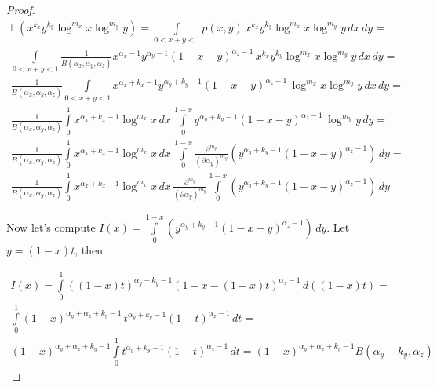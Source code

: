 \documentclass{article}
\begin{document}
\begin{theorem}
\begin{proof}
	\begin{multline*}
	\mathbb{E}(x^{k_x} y^{k_y} \log^{m_x} x \log^{m_y} y) = \int\limits_{0 < x + y < 1} {p(x, y) \, x^{k_x} y^{k_y} \log^{m_x} x \log^{m_y} y \, dx \, dy} = 
	\\ \int\limits_{0 < x + y < 1} {\frac{1}{B(\alpha_x, \alpha_y, \alpha_z)} x^{\alpha_x - 1} y^{\alpha_y - 1} (1 - x - y)^{\alpha_z - 1} \, x^{k_x} y^{k_y} \log^{m_x} x \log^{m_y} y \, dx \, dy} = 
	\\ \frac{1}{B(\alpha_x, \alpha_y, \alpha_z)} \int\limits_{0 < x + y < 1} { x^{\alpha_x + k_x - 1} y^{\alpha_y + k_y - 1} (1 - x - y)^{\alpha_z - 1} \, \log^{m_x} x \log^{m_y} y \, dx \, dy} = 
	\\ \frac{1}{B(\alpha_x, \alpha_y, \alpha_z)} \int\limits_0^1 { x^{\alpha_x + k_x - 1} \log^{m_x}{x} \, dx \, \int\limits_0^{1-x}{ y^{\alpha_y + k_y - 1} (1 - x - y)^{\alpha_z - 1} \, \log^{m_y} y \, dy}} = 
	\\  \frac{1}{B(\alpha_x, \alpha_y, \alpha_z)} \int\limits_0^1 { x^{\alpha_x + k_x - 1} \log^{m_x}{x} \, dx \, \int\limits_0^{1-x}{ \frac{\partial^{m_y}}{(\partial \alpha_y)^{m_y}} (y^{\alpha_y + k_y - 1} (1 - x - y)^{\alpha_z - 1}) \, dy}} = 
	\\ \frac{1}{B(\alpha_x, \alpha_y, \alpha_z)} \int\limits_0^1 { x^{\alpha_x + k_x - 1} \log^{m_x}{x} \, dx \, \frac{\partial^{m_y}}{(\partial \alpha_y)^{m_y}} \int\limits_0^{1-x}{  (y^{\alpha_y + k_y - 1} (1 - x - y)^{\alpha_z - 1}) \, dy}} 
	\end{multline*}
	
	Now let's compute $I(x) = \int\limits_0^{1-x}{  (y^{\alpha_y + k_y - 1} (1 - x - y)^{\alpha_z - 1}) \, dy} $. Let $y = (1 - x)t$, then
	
	\begin{multline*}
	I(x) = \int\limits_0^1{((1 - x)t)^{\alpha_y + k_y - 1} (1 - x - (1 - x)t)^{\alpha_z - 1} \, d((1 - x)t)} = \\ \int\limits_0^1{(1 - x)^{\alpha_y + \alpha_z + k_y - 1} \, t^{\alpha_y + k_y - 1} (1 - t)^{\alpha_z - 1} \, dt} = \\ (1 - x)^{\alpha_y + \alpha_z + k_y - 1} \int\limits_0^1{t^{\alpha_y + k_y - 1} (1 - t)^{\alpha_z - 1} \, dt} = (1 - x)^{\alpha_y + \alpha_z + k_y - 1} B(\alpha_y + k_y, \alpha_z)
	\end{multline*}
	

\end{proof}
\end{theorem}
\end{document}
